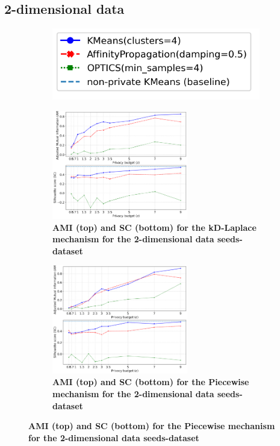 \subsection{2-dimensional data}
\begin{figure}[H]
    \centering
    \begin{subfigure}{0.3\textwidth}
        \includegraphics[width=\textwidth]{Results/2d-laplace/seeds-dataset/legend.png}
    \end{subfigure}
    \begin{subfigure}{1\textwidth}
        \centering
        \caption{\textbf{AMI (top) and SC (bottom) for the kD-Laplace mechanism for the 2-dimensional data seeds-dataset}}
        \includegraphics[width=0.65\textwidth]{Results/kd-laplace/kd-Laplace/seeds-dataset/ami-and-sc_2_dimensions.png}
        \centering
    \end{subfigure}
    \begin{subfigure}{1\textwidth}
        \centering
        \caption{\textbf{AMI (top) and SC (bottom) for the Piecewise mechanism for the 2-dimensional data seeds-dataset}}
        \includegraphics[width=0.65\textwidth]{Results/kd-laplace/piecewise/seeds-dataset/ami-and-sc_2_dimensions.png}
    \end{subfigure}
    \label{fig:validation-seeds-dataset_comparison_2d-laplace}
\end{figure}
